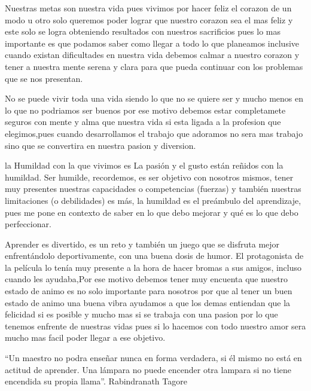 \documentclass[12pt]{article}
\begin{document}
\vspace{15PT}
Nuestras metas son nuestra vida pues vivimos por hacer feliz el corazon de un modo u otro solo queremos poder lograr que nuestro corazon sea el mas feliz y este solo se logra obteniendo resultados con nuestros sacrificios pues lo mas importante es que podamos saber como llegar a todo lo que planeamos inclusive cuando existan dificultades en nuestra vida debemos calmar a nuestro corazon y tener a nuestra mente serena y clara para que pueda continuar con los problemas que se nos presentan.

\vspace{15PT}
No se puede vivir toda una vida siendo lo que no se quiere ser y mucho menos en lo que no podriamos ser buenos por ese motivo debemos estar completamete seguros con mente y alma que nuestra vida si esta ligada a la profesion que elegimos,pues cuando desarrollamos el trabajo que adoramos no sera mas trabajo sino que se convertira en nuestra pasion y diversion.

\vspace{15PT}
la Humildad con la que vivimos es La pasión y el gusto están reñidos con la humildad. Ser humilde, recordemos, es ser objetivo con nosotros mismos, tener muy presentes nuestras capacidades o competencias (fuerzas) y también nuestras limitaciones (o debilidades) es más, la humildad es el preámbulo del aprendizaje, pues me pone en contexto de saber en lo que debo mejorar y qué es lo que debo perfeccionar.

\vspace{15PT}
 Aprender es divertido, es un reto y también un juego que se disfruta mejor enfrentándolo deportivamente, con una buena dosis de humor. El protagonista de la película lo tenía muy presente a la hora de hacer bromas a sus amigos, incluso cuando les ayudaba,Por ese motivo debemos tener muy encuenta que nuestro estado de animo es no solo importante para nosotros por que al tener un buen estado de animo una buena vibra ayudamos a que los demas entiendan que la felicidad si es posible y mucho mas si se trabaja con una pasion por lo que tenemos enfrente de nuestras vidas pues si lo hacemos con todo nuestro amor sera mucho mas facil poder llegar a ese objetivo.
 
\vspace{15PT}
“Un maestro no podra enseñar nunca en forma verdadera, si él mismo no está en actitud de aprender. Una lámpara no puede encender otra lampara si no tiene encendida su propia llama”. Rabindranath Tagore
\end{document}
